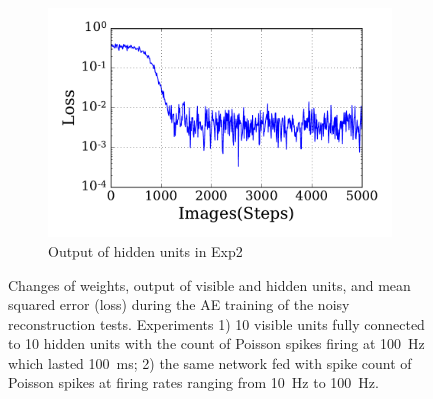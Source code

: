 \begin{figure}
\begin{subfigure}[t]{0.48\textwidth}
		\includegraphics[width=\textwidth]{pics_sdlm/21_exp_AE_noise/exp2_loss_s.pdf}
		\caption{Output of hidden units in Exp2}
	\end{subfigure}
	\DIFdelbeginFL %
\DIFdelendFL \DIFaddbeginFL \caption[AE-NI training of the reconstruction tests.]{\DIFaddendFL Changes of weights, output of visible and hidden units, and mean squared error (loss) during the AE training of the noisy reconstruction tests. 
		Experiments 1) 10 visible units fully connected to 10 hidden units with the count of Poisson spikes firing at 100~Hz which lasted 100~ms; 2) the same network fed with spike count of Poisson spikes at firing rates ranging from 10~Hz to 100~Hz.}
	\label{fig:ae_noise}
\end{figure}

